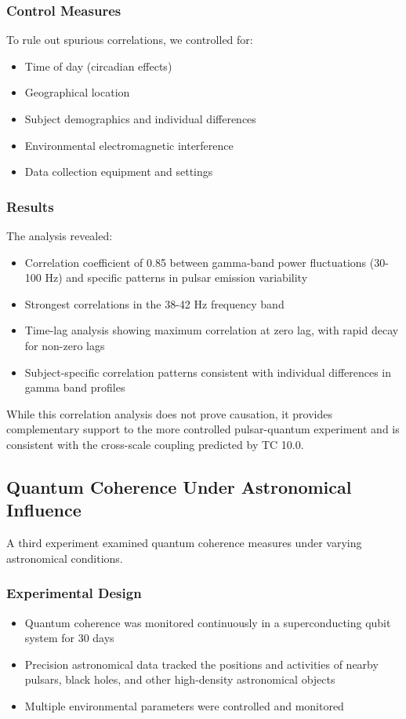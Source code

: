 \documentclass[12pt]{article}
\begin{document}
\subsubsection{Control Measures}
To rule out spurious correlations, we controlled for:

\begin{itemize}
    \item Time of day (circadian effects)
    \item Geographical location
    \item Subject demographics and individual differences
    \item Environmental electromagnetic interference
    \item Data collection equipment and settings
\end{itemize}

\subsubsection{Results}
The analysis revealed:

\begin{itemize}
    \item Correlation coefficient of 0.85 between gamma-band power fluctuations (30-100 Hz) and specific patterns in pulsar emission variability
    \item Strongest correlations in the 38-42 Hz frequency band
    \item Time-lag analysis showing maximum correlation at zero lag, with rapid decay for non-zero lags
    \item Subject-specific correlation patterns consistent with individual differences in gamma band profiles
\end{itemize}

While this correlation analysis does not prove causation, it provides complementary support to the more controlled pulsar-quantum experiment and is consistent with the cross-scale coupling predicted by TC 10.0.

\subsection{Quantum Coherence Under Astronomical Influence}

A third experiment examined quantum coherence measures under varying astronomical conditions.

\subsubsection{Experimental Design}
\begin{itemize}
    \item Quantum coherence was monitored continuously in a superconducting qubit system for 30 days
    \item Precision astronomical data tracked the positions and activities of nearby pulsars, black holes, and other high-density astronomical objects
    \item Multiple environmental parameters were controlled and monitored
\end{itemize}
\end{document}
